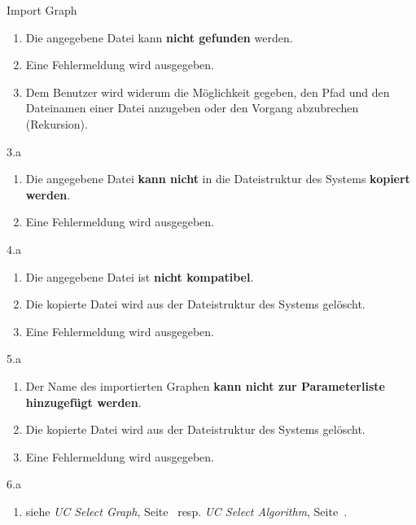 \begin{usecase}{Import Graph}
{		    \begin{enumerate}
			\item Die angegebene Datei kann \textbf{nicht gefunden} werden.
			\item Eine Fehlermeldung wird ausgegeben.
			\item Dem Benutzer wird widerum die M\"oglichkeit gegeben, den Pfad und den Dateinamen einer Datei anzugeben oder den Vorgang abzubrechen (Rekursion).
		    \end{enumerate}
	    \item[3.a]
		    \begin{enumerate}
			\item Die angegebene Datei \textbf{kann nicht} in die Dateistruktur des Systems \textbf{kopiert werden}.
			\item Eine Fehlermeldung wird ausgegeben.
		    \end{enumerate}
	    \item[4.a]
		    \begin{enumerate}
			\item Die angegebene Datei ist \textbf{nicht kompatibel}.
			\item Die kopierte Datei wird aus der Dateistruktur des Systems gel\"oscht.
			\item Eine Fehlermeldung wird ausgegeben.
		    \end{enumerate}
	    \item[5.a]
		    \begin{enumerate}
			\item Der Name des importierten Graphen \textbf{kann nicht zur Parameterliste hinzugef\"ugt werden}.
			\item Die kopierte Datei wird aus der Dateistruktur des Systems gel\"oscht.
			\item Eine Fehlermeldung wird ausgegeben.
		    \end{enumerate}
	    \item[6.a]
		    \begin{enumerate}
			\item siehe \textit{UC Select Graph}, Seite~\pageref{uc:Select Graph} resp. \textit{UC Select Algorithm}, Seite~\pageref{uc:Select Algorithm}.
		    \end{enumerate}
    }
\end{usecase}
\newpage 
% 
